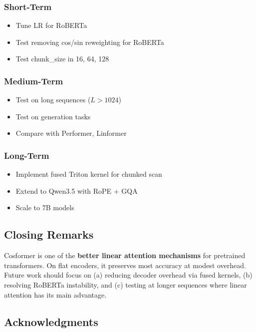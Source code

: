 \subsubsection{Short-Term}

\begin{itemize}
\item Tune LR for RoBERTa
\item Test removing cos/sin reweighting for RoBERTa
\item Test chunk\_size in {16, 64, 128}

\end{itemize}
\subsubsection{Medium-Term}

\begin{itemize}
\item Test on long sequences ($L > 1024$)
\item Test on generation tasks
\item Compare with Performer, Linformer

\end{itemize}
\subsubsection{Long-Term}

\begin{itemize}
\item Implement fused Triton kernel for chunked scan
\item Extend to Qwen3.5 with RoPE + GQA
\item Scale to 7B models

\end{itemize}
\subsection{Closing Remarks}

Cosformer is one of the \textbf{better linear attention mechanisms} for 
pretrained transformers. On flat encoders, it preserves most accuracy at 
modest overhead. Future work should focus on (a) reducing decoder overhead 
via fused kernels, (b) resolving RoBERTa instability, and (c) testing at 
longer sequences where linear attention has its main advantage.

\subsection{Acknowledgments}

